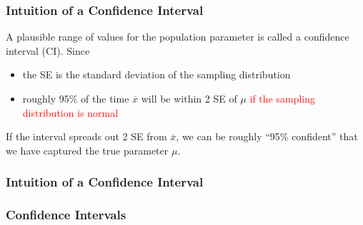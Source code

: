 \documentclass[handout]{beamer}
\newcommand{\blue}[1]{\textcolor{blue2}{#1}}
\newcommand{\red}[1]{\textcolor{red}{#1}}
\newcommand{\xbar}{\overline{x}}
\begin{document}
\begin{frame}[fragile]
\frametitle{Intuition of a Confidence Interval}
A plausible range of values for the population parameter is called a \blue{confidence interval (CI)}.  Since
\begin{itemize}
\pause \item the SE is the standard deviation of the sampling distribution
\pause \item roughly 95\% of the time $\xbar$ will be within 2 SE of $\mu$ \red{if the sampling distribution is normal}
\end{itemize}

\pause If the interval spreads out 2 SE from $\xbar$, we can be roughly
\blue{``95\% confident''} that we have captured the true parameter $\mu$.  
\end{frame}


\begin{frame}[fragile]
\frametitle{Intuition of a Confidence Interval}

%
%
%
%

\end{frame}


\begin{frame}
\frametitle{Confidence Intervals}

%
%
%
%
%

\end{frame}
\end{document}
